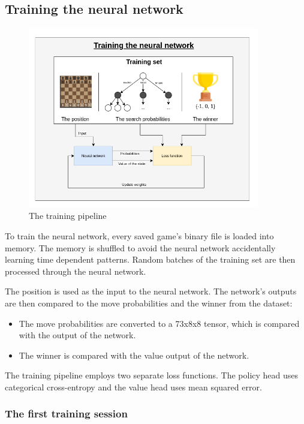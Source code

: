 \documentclass{article}
\begin{document}
\subsection{Training the neural network}

\begin{figure}[H]
    \centering
    \includegraphics[width=0.9\textwidth]{img/training.png}
    \caption{The training pipeline}
\end{figure}

To train the neural network, every saved game's binary file is loaded 
into memory. The memory is shuffled to avoid the neural network accidentally learning
time dependent patterns. Random batches of the training set are then processed through the
neural network.

The position is used as the input to the neural network. The network's outputs are then 
compared to the move probabilities and the winner from the dataset:

\begin{itemize}
    \item The move probabilities are converted to a 73x8x8 tensor, which is compared with the output of the network.
    \item The winner is compared with the value output of the network.
\end{itemize}

The training pipeline employs two separate loss functions. The policy head uses categorical cross-entropy
and the value head uses mean squared error.

\subsubsection{The first training session}
\end{document}
